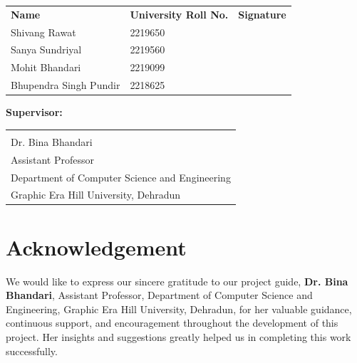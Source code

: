 \documentclass[12pt,a4paper]{report}
\begin{document}
\vspace{0.8cm}

\noindent
\begin{tabular}{p{4.5cm} p{4cm} p{4cm}}
\textbf{Name} & \textbf{University Roll No.} & \textbf{Signature} \\[0.4cm]
Shivang Rawat           & 2219650 & \underline{\hspace{2cm}} \\[0.35cm]
Sanya Sundriyal         & 2219560 & \underline{\hspace{2cm}} \\[0.35cm]
Mohit Bhandari          & 2219099 & \underline{\hspace{2cm}} \\[0.35cm]
Bhupendra Singh Pundir  & 2218625 & \underline{\hspace{2cm}} \\
\end{tabular}

\vspace{1cm}

\noindent\textbf{Supervisor:}\\[0.6cm]

\noindent
\begin{tabular}{l}
\underline{\hspace{4cm}} \\
Dr. Bina Bhandari \\
Assistant Professor \\
Department of Computer Science and Engineering \\
Graphic Era Hill University, Dehradun \\
\end{tabular}

\newpage

\chapter*{Acknowledgement}

We would like to express our sincere gratitude to our project guide, \textbf{Dr. Bina Bhandari}, Assistant Professor, Department of Computer Science and Engineering, Graphic Era Hill University, Dehradun, for her valuable guidance, continuous support, and encouragement throughout the development of this project. Her insights and suggestions greatly helped us in completing this work successfully.
\end{document}
